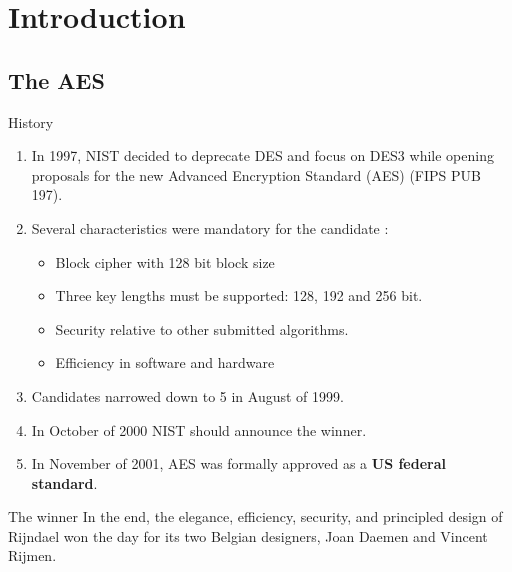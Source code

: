 

\section{Introduction}

\subsection{The AES}

\begin{frame}[t]{History}
	\begin{enumerate}
		\item In 1997, NIST decided to deprecate DES and focus on DES3 while opening proposals for the new Advanced Encryption Standard (AES) (FIPS PUB 197).
		\item Several characteristics were mandatory for the candidate \cite{Paar2010understanding}:
			\begin{itemize}
				\item Block cipher with 128 bit block size
				\item Three key lengths must be supported: 128, 192 and 256 bit.
				\item Security relative to other submitted algorithms.
				\item Efficiency in software and hardware
			\end{itemize}
		\item Candidates narrowed down to 5 in August of 1999.
		\item In October of 2000 NIST should announce the winner.
		\item In November of 2001, AES was formally approved as a \textbf{US federal standard}.
	\end{enumerate}
\end{frame}

\begin{frame}[t]{The winner}
	In the end, the elegance, efficiency, security, and principled design of
	Rijndael won the day for its two Belgian designers, Joan Daemen and Vincent
	Rijmen.
\end{frame}




